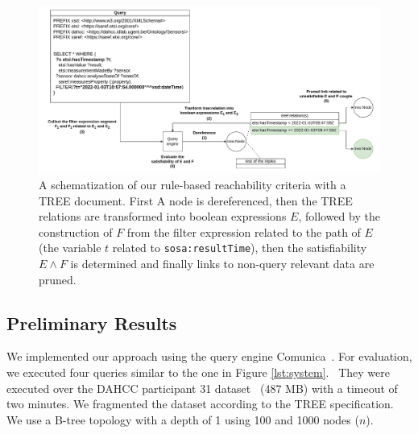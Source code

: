 \begin{figure}[htbp]
    \centering
    \includegraphics[width=\linewidth]{image/running_example.drawio.pdf}
    \caption{A schematization of our rule-based reachability criteria with a TREE document.
     First A node is dereferenced, then the TREE relations are transformed into boolean expressions $E$,
      followed by the construction of $F$ from the filter expression related to the path of $E$ (the variable $t$ related to \texttt{sosa:resultTime}),
       then the satisfiability $E \land F$ is determined and finally links to non-query relevant data are pruned.}
    \label{fig:process}
  \end{figure}

\subsection{Preliminary Results}

We implemented our approach using the query engine Comunica~\cite{comunica}.
For evaluation, we executed four queries similar to the one in Figure \ref{lst:system}.~
They were executed over the DAHCC participant 31 dataset~\cite{dahcc_resource} (487 MB) with a timeout of two minutes.
We fragmented the dataset according to the TREE specification.
We use a B-tree topology with a depth of 1 using 100 and 1000 nodes ($n$).

